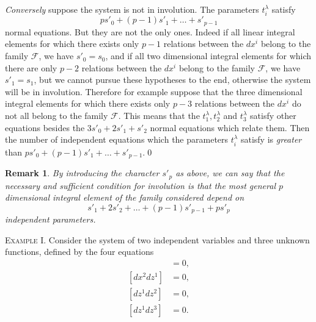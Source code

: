 \documentclass[leqno,11pt]{book}
\numberwithin{equation}{chapter}
\theoremstyle{shape1}
\theoremstyle{shape0}
\newtheorem*{rmk*}{\hspace{15pt}Remark}
\theoremstyle{shape2}
\theoremstyle{definition}
\begin{document}
\emph{Conversely} suppose the system is not in involution. The parameters $t_{i}^{\lambda}$ satisfy
\[
ps'_{0}+(p-1)s'_{1}+\dots+s'_{p-1}
\]
normal equations. But they are not the only ones. Indeed if all linear integral elements for which there exists only $p-1$ relations between the $dx^{i}$ belong to the family $\mathcal{F}$, we have $s'_{0}=s_{0}$, and if all two dimensional integral elements for which there are only $p-2$ relations between the $dx^{i}$ belong to the family $\mathcal{F}$, we have $s'_{1}=s_{1}$, but we cannot pursue these hypotheses to the end, otherwise the system will be in involution.  Therefore for example suppose that the three dimensional integral elements for which there exists only $p-3$ relations between the $dx^{i}$ do not all belong to the family $\mathcal{F}$. This means that the $t_{1}^{\lambda},t_{2}^{\lambda}$ and $t_{3}^{\lambda}$ satisfy other equations besides the $3s'_{0}+2s'_{1}+s'_{2}$ normal equations which relate them. Then the number of independent equations  which the parameters $t_{i}^{\lambda}$ satisfy is \emph{greater} than $ps'_{0}+(p-1)s'_{1}+\dots+s'_{p-1}$.\qed

\begin{rmk*} By introducing  the character $s'_{p}$ as above, we can say that \emph{the necessary and sufficient condition for involution is that the most general $p$ dimensional integral element of the family considered depend on}
\[
s'_{1}+2s'_{2}+\dots+(p-1)s'_{p-1}+ps'_{p}
\]
\emph{independent parameters.}
  
\end{rmk*}



\vspace{12pt}\fsec \textsc{Example I.} Consider the system of two independent variables and three unknown functions, defined by the four equations
\begin{align*}
  [dx^{1}dz^{1}]&=0,\\
  [dx^{2}dz^{1}]&=0,\\
  [dz^{1}dz^{2}]&=0,\\
  [dz^{1}dz^{3}]&=0.
\end{align*}
\end{document}
